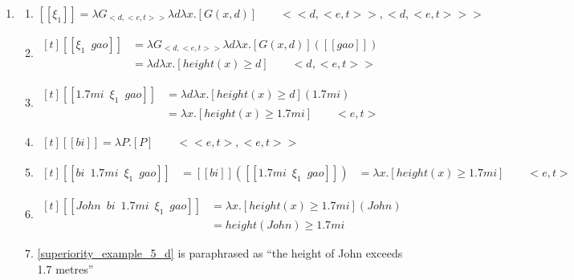 \documentclass{ctexart}
\begin{document}
\begin{enumerate}
    \item \label{superiority_example_5}
    \begin{enumerate}
        \item \label{superiority_example_5_a}
        $[\![\xi_1]\!] = \lambda G_{<d,<e,t>>} \lambda d \lambda x.[G(x,d)] \qquad <<d,<e,t>>,<d,<e,t>>>$

        \item \label{superiority_example_5_b}
        $\begin{aligned}[t]
            [\![\xi_1 \enspace gao]\!] &= \lambda G_{<d,<e,t>>} \lambda d \lambda x.[G(x,d)]([\![gao]\!]) \\
            &= \lambda d \lambda x.[height(x) \geq d] \qquad <d,<e,t>>
        \end{aligned}$

        \item \label{superiority_example_5_c}
        $\begin{aligned}[t]
            [\![1.7mi \enspace \xi_1 \enspace gao]\!]
            &= \lambda d \lambda x.[height(x) \geq d](1.7mi) \\
            &= \lambda x.[height(x) \geq 1.7mi] \qquad <e,t>
        \end{aligned}$

        \item \label{superiority_example_5_c_1}
        $\begin{aligned}[t]
            [\![bi]\!] = \lambda P.[P] \qquad <<e,t>,<e,t>>
        \end{aligned}$

        \item \label{superiority_example_5_c_2}
        $\begin{aligned}[t]
            [\![bi \enspace 1.7mi \enspace \xi_1 \enspace gao]\!] &= [\![bi]\!]([\![1.7mi \enspace \xi_1 \enspace gao]\!])
            &= \lambda x.[height(x) \geq 1.7mi] \qquad <e,t>
        \end{aligned}$

        \item \label{superiority_example_5_d}
        $\begin{aligned}[t]
            [\![John \enspace bi \enspace 1.7mi \enspace \xi_1 \enspace gao]\!] &= \lambda x.[height(x) \geq 1.7mi](John) \\
            &= height(John) \geq 1.7mi
        \end{aligned}$

        \item \label{superiority_example_5_e}
        \ref{superiority_example_5_d} is paraphrased as ``the height of John exceeds 1.7 metres''

    \end{enumerate}
\end{enumerate}
\end{document}
